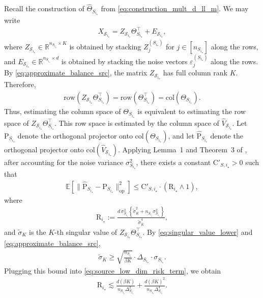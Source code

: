 \documentclass[10pt]{article}
\newcommand{\R}{\mathbb R}
\newcommand{\op}{\mathrm{op}}
\newcommand{\col}{\mathrm{col}}
\newcommand{\row}{\mathrm{row}}
\newcommand{\wh}{\widehat}
\newcommand{\wt}{\widetilde}
\newcommand{\calS}{\mathcal S}
\newcommand{\src}{S}
\newcommand{\nSm}[1]{n_{\src_{#1}}}
\newcommand{\sigmaSm}[1]{\sigma_{\src_{#1}}}
\newcommand{\Zsrcm}[1]{Z^{(\src_{#1})}}
\newcommand{\ThetamS}[1]{\Theta_{\src_{#1}}}
\newcommand{\epsm}[1]{\varepsilon^{(\src_{#1})}}
\newcommand{\DeltaSm}[1]{\Delta_{\src_{#1}}}
\newcommand{\hatThetaS}[1]{\wh{\Theta}_{S_{#1}}}
\begin{document}
Recall the construction of $\hatThetaS{i_\star}$ from \eqref{eq:construction_mult_d_ll_m}. We may write
\begin{align}
X_{\calS_{i_\star}}=Z_{\calS_{i_\star}}\ThetamS{i_\star}^{\top}+E_{\calS_{i_\star}},
\end{align}
where $Z_{\calS_{i_\star}}\in\R^{\nSm{i_\star}\times K}$ is obtained by stacking $\Zsrcm{i_\star}_j$ for $j\in[\nSm{i_\star}]$ along the rows, and $E_{\calS_{i_\star}}\in\R^{\nSm{i_\star}\times d}$ is obtained by stacking the noise vectors $\epsm{i_\star}_j$ along the rows. By \eqref{eq:approximate_balance_src}, the matrix $Z_{\calS_{i_\star}}$ has full column rank $K$. Therefore,
\begin{align}
\row\left(Z_{\calS_{i_\star}}\ThetamS{i_\star}^{\top}\right)=\row\left(\ThetamS{i_\star}^{\top}\right)=\col\left(\ThetamS{i_\star}\right).
\end{align}
Thus, estimating the column space of $\ThetamS{i_\star}$ is equivalent to estimating the row space of $Z_{\calS_{i_\star}}\ThetamS{i_\star}^{\top}$. This row space is estimated by the column space of $\wh V_{\calS_{i_\star}}$. Let $\mathrm P_{\src_{i_\star}}$ denote the orthogonal projector onto $\col(\ThetamS{i_\star})$, and let $\widehat{\mathrm P}_{\src_{i_\star}}$ denote the orthogonal projector onto $\col(\wh V_{\calS_{i_\star}})$. Applying Lemma~1 and Theorem~3 of \citet{CaiZhang2018}, after accounting for the noise variance $\sigmaSm{i_\star}^2$, there exists a constant $\mathrm C'_{\src,i_\star}>0$ such that
\begin{align}
    \mathbb E\left[\|\widehat{\mathrm P}_{\src_{i_\star}}-\mathrm P_{\src_{i_\star}}\|_{\op}^2\right]\le \mathrm C'_{\src,i_\star}\cdot(\mathrm R_{i_\star}\wedge 1),
\end{align}
where
\begin{align}
\label{eq:source_low_dim_risk_term}
    \mathrm R_{i_\star}:=\frac{d\,\sigmaSm{i_\star}^2\left\{\wt\sigma_K^2+\nSm{i_\star}\sigmaSm{i_\star}^2\right\}}{\wt\sigma_K^4},
\end{align}
and $\wt\sigma_K$ is the $K$-th singular value of $Z_{\calS_{i_\star}}\ThetamS{i_\star}^{\top}$. By \eqref{eq:singular_value_lower} and \eqref{eq:approximate_balance_src},
\begin{align}
    \wt\sigma_K\ge \sqrt{\frac{\nSm{i_\star}}{\beta K}}\cdot\DeltaSm{i_\star}\cdot\sigmaSm{i_\star}.
\end{align}
Plugging this bound into \eqref{eq:source_low_dim_risk_term}, we obtain
\begin{align}
\label{eq:source_low_dim_risk_bound}
    \mathrm R_{i_\star}\lesssim \frac{d(\beta K)}{\nSm{i_\star}\DeltaSm{i_\star}^2}+\frac{d(\beta K)^2}{\nSm{i_\star}\DeltaSm{i_\star}^4}.
\end{align}
\end{document}
